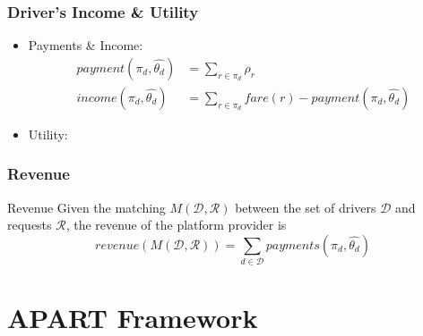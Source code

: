 \documentclass[t]{beamer}
\begin{document}
\begin{frame}\frametitle{Driver's Income \& Utility}
\begin{itemize}
\item Payments \& Income:
\begin{align*}
payment(\pi_d, \hat{\theta_d}) &= \sum_{r \in \pi_d} \rho_r\\
income(\pi_d, \hat{\theta_d}) &= \sum_{r \in \pi_d} fare(r) - payment(\pi_d, \hat{\theta_d})
\end{align*}
\item<2-> Utility:
\end{itemize}
\end{frame}

\begin{frame}\frametitle{Revenue}
\begin{exampleblock}{Revenue}
Given the matching $M(\mathcal{D}, \mathcal{R})$ between the set of drivers $\mathcal{D}$ and requests $\mathcal{R}$, the revenue of the platform provider is
\begin{equation*}
revenue(M(\mathcal{D}, \mathcal{R})) = \sum_{d \in \mathcal{D}} payments(\pi_d, \hat{\theta_d})
\end{equation*}
\end{exampleblock}
\end{frame}

\section{APART Framework}
\end{document}
